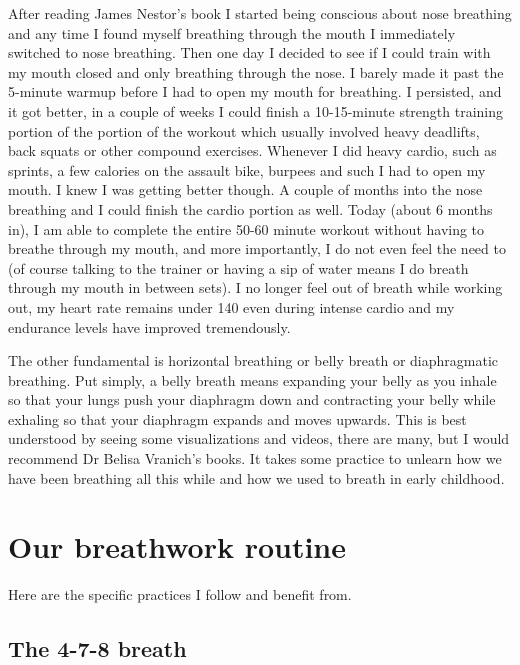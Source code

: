 \documentclass[
  oneside]{book}
\begin{document}
After reading James Nestor's book I started being conscious about nose breathing and any time I found myself breathing through the mouth I immediately switched to nose breathing. Then one day I decided to see if I could train with my mouth closed and only breathing through the nose. I barely made it past the 5-minute warmup before I had to open my mouth for breathing. I persisted, and it got better, in a couple of weeks I could finish a 10-15-minute strength training portion of the portion of the workout which usually involved heavy deadlifts, back squats or other compound exercises. Whenever I did heavy cardio, such as sprints, a few calories on the assault bike, burpees and such I had to open my mouth. I knew I was getting better though. A couple of months into the nose breathing and I could finish the cardio portion as well. Today (about 6 months in), I am able to complete the entire 50-60 minute workout without having to breathe through my mouth, and more importantly, I do not even feel the need to (of course talking to the trainer or having a sip of water means I do breath through my mouth in between sets). I no longer feel out of breath while working out, my heart rate remains under 140 even during intense cardio and my endurance levels have improved tremendously.

The other fundamental is horizontal breathing or belly breath or diaphragmatic breathing. Put simply, a belly breath means expanding your belly as you inhale so that your lungs push your diaphragm down and contracting your belly while exhaling so that your diaphragm expands and moves upwards. This is best understood by seeing some visualizations and videos, there are many, but I would recommend Dr Belisa Vranich's books. It takes some practice to unlearn how we have been breathing all this while and how we used to breath in early childhood.

\hypertarget{our-breathwork-routine}{%
\section{Our breathwork routine}\label{our-breathwork-routine}}

Here are the specific practices I follow and benefit from.

\hypertarget{the-4-7-8-breath}{%
\subsection{The 4-7-8 breath}\label{the-4-7-8-breath}}
\end{document}

